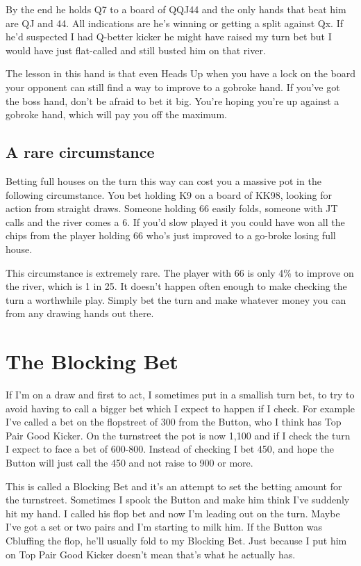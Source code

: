 By the end he holds Q7 to a board of QQJ44 and the only hands that beat
him are QJ and 44. All indications are he's winning or getting a split
against Qx. If he'd suspected I had Q-better kicker he might have
raised my turn bet but I would have just flat-called and still busted
him on that river.

The lesson in this hand is that even Heads Up when you have a lock on
the board your opponent can still find a way to improve to a gobroke
hand. If you've got the boss hand, don't be afraid to bet it big. You're
hoping you're up against a gobroke hand, which will pay you off
the maximum.

\subsection*{A rare circumstance}

Betting full houses on the turn this way can cost you a massive pot in
the following circumstance. You bet holding K9 on a board
of KK98, looking for action from straight draws. Someone
holding 66 easily folds, someone with JT calls and the river comes
a 6. If you'd slow played it you could have won all the chips from
the player holding 66 who's just improved to a go-broke losing full
house.

This circumstance is extremely rare. The player with 66 is only 4\% to
improve on the river, which is 1 in 25. It doesn't happen often enough
to make checking the turn a worthwhile play. Simply bet
the turn and make whatever money you can from any drawing hands
out there.

\section{The Blocking Bet}

If I'm on a draw and first to act, I sometimes put in a smallish
turn bet, to try to avoid having to call a bigger bet which
I  expect to happen if I check. For example I've called a bet on the
flopstreet of 300 from the Button, who I think has Top Pair
Good Kicker. On the turnstreet the pot is now 1,100 and if I check the
turn I expect to face a bet of 600-800. Instead of checking I bet 450,
and hope the Button will just call the 450 and not raise to 900 or
more.

This is called a Blocking Bet and it's an attempt to set the betting
amount for the turnstreet. Sometimes I spook the Button and make him
think I've suddenly hit my hand. I called his flop bet and now I'm
leading out on the turn. Maybe I've got a set or two pairs and I'm
starting to milk him. If the Button was Cbluffing the flop, he'll
usually fold to my Blocking Bet. Just because I put him on Top Pair
Good Kicker doesn't mean that's what he actually has.

